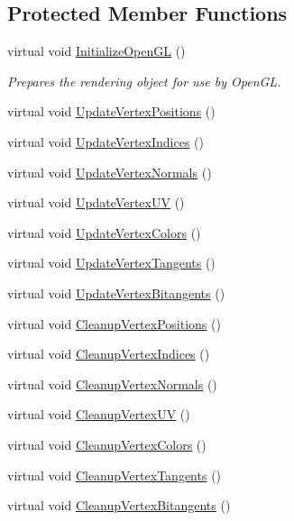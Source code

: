 \subsection*{Protected Member Functions}
\begin{DoxyCompactItemize}
\item 
virtual void \hyperlink{class_rendering_object_a77c78d1b42ea2ebfdbf994b6b91ce805}{Initialize\+Open\+GL} ()
\begin{DoxyCompactList}\small\item\em Prepares the rendering object for use by Open\+GL. \end{DoxyCompactList}\item 
virtual void \hyperlink{class_rendering_object_a7a097727acf37f9671ddd5e3a9873771}{Update\+Vertex\+Positions} ()
\item 
virtual void \hyperlink{class_rendering_object_afb49054121b1b552bce58625db91b851}{Update\+Vertex\+Indices} ()
\item 
virtual void \hyperlink{class_rendering_object_ae4b537e1c9b1c5c50cb7b0db83e6f190}{Update\+Vertex\+Normals} ()
\item 
virtual void \hyperlink{class_rendering_object_ac00889f2afaa605b09164649ef68a1b6}{Update\+Vertex\+UV} ()
\item 
virtual void \hyperlink{class_rendering_object_aca18dbb9252f27cef09df307dbcf02a9}{Update\+Vertex\+Colors} ()
\item 
virtual void \hyperlink{class_rendering_object_a5b480a9b97cadfa07669902764139272}{Update\+Vertex\+Tangents} ()
\item 
virtual void \hyperlink{class_rendering_object_a594a50e9475057aaf21a0b05b33a5b16}{Update\+Vertex\+Bitangents} ()
\item 
virtual void \hyperlink{class_rendering_object_af9c1a07398071cdd0cca3ad36095fc85}{Cleanup\+Vertex\+Positions} ()
\item 
virtual void \hyperlink{class_rendering_object_ac60c8a7f3d5678fd4aa8198f6c980e6e}{Cleanup\+Vertex\+Indices} ()
\item 
virtual void \hyperlink{class_rendering_object_ad89bc24893f8fe32794f0686c2bb0da1}{Cleanup\+Vertex\+Normals} ()
\item 
virtual void \hyperlink{class_rendering_object_a776f54b41f9e9f0e55fc1104919c3e7c}{Cleanup\+Vertex\+UV} ()
\item 
virtual void \hyperlink{class_rendering_object_adce4a6d6406eb589b088bedd19127f32}{Cleanup\+Vertex\+Colors} ()
\item 
virtual void \hyperlink{class_rendering_object_a0e6c8c9480f1c04202aa6d38a841f06f}{Cleanup\+Vertex\+Tangents} ()
\item 
virtual void \hyperlink{class_rendering_object_ae60c4f13ea817ffcb722d34250664c41}{Cleanup\+Vertex\+Bitangents} ()
\end{DoxyCompactItemize}

